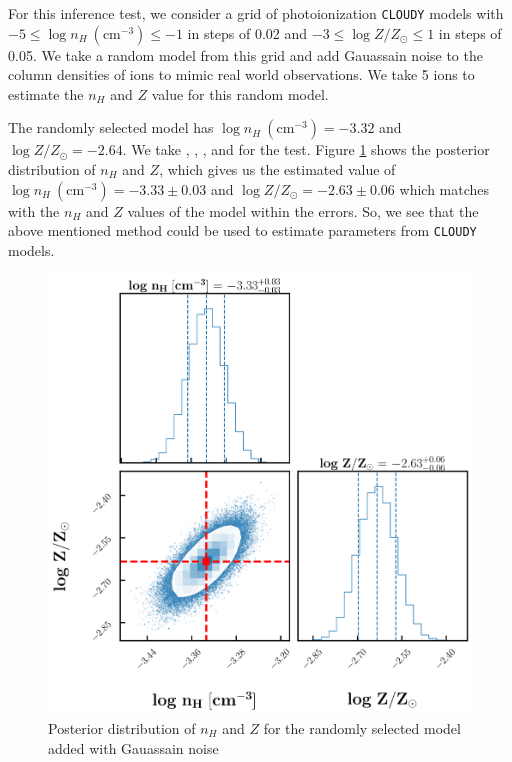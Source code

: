 For this inference test, we consider a grid of photoionization {\tt CLOUDY} models with $-5 \leq \log n_H \ (\text{cm}^{-3}) \leq -1 $ in steps of 0.02 and $ -3 \leq \log Z/Z_\odot \leq 1 $ in steps of 0.05. We take a random model from this grid and add Gauassain noise to the column densities of ions to mimic real world observations. We take 5 ions to estimate the $n_H$ and $Z$ value for this random model. 

The randomly selected model has $\log n_H \ (\text{cm}^{-3}) = -3.32$ and $\log Z/Z_\odot = -2.64 $. We take , , ,  and  for the test. Figure \ref{fig:inference-test} shows the posterior distribution of $n_H$ and $Z$, which gives us the estimated value of $\log n_H \ (\text{cm}^{-3}) = -3.33 \pm 0.03$ and $\log Z/Z_\odot = -2.63 \pm 0.06 $ which matches with the $n_H$ and $Z$ values of the model within the errors. So, we see that the above mentioned method could be used to estimate parameters from {\tt CLOUDY} models.

\newpage

\begin{figure}[!h]
    \centering
    \includegraphics[width=\textwidth]{Figures/inference-test.png}
    \caption{Posterior distribution of $n_H$ and $Z$ for the randomly selected model added with Gauassain noise}
    \label{fig:inference-test}
\end{figure}
